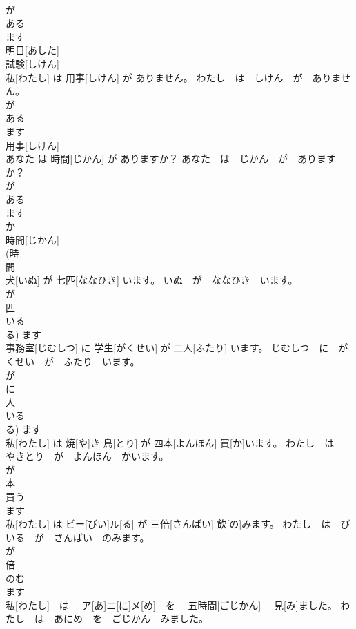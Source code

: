 \documentclass[8pt]{extreport}
\begin{document}
\begin{CJK}{UTF8}{min}
\\	が 
\\	ある 
\\	ます 
\\	明日[あした] 
\\	試験[しけん] 
\\	私[わたし] は 用事[しけん] が ありません。	わたし　は　しけん　が　ありません。	
\\	が 
\\	ある 
\\	ます 
\\	用事[しけん] 
\\	あなた は 時間[じかん] が ありますか？	あなた　は　じかん　が　ありますか？	
\\	が 
\\	ある 
\\	ます 
\\	か 
\\	時間[じかん] 
\\	(時 
\\	間 
\\	犬[いぬ] が 七匹[ななひき] います。	いぬ　が　ななひき　います。	
\\	が 
\\	匹 
\\	いる 
\\	る)	ます 
\\	事務室[じむしつ] に 学生[がくせい] が 二人[ふたり] います。	じむしつ　に　がくせい　が　ふたり　います。	
\\	が 
\\	に 
\\	人 
\\	いる 
\\	る)	ます 
\\	私[わたし] は 焼[や]き 鳥[とり] が 四本[よんほん] 買[か]います。	わたし　は　やきとり　が　よんほん　かいます。	
\\	が 
\\	本 
\\	買う 
\\	ます 
\\	私[わたし] は ビー[びい]ル[る] が 三倍[さんばい] 飲[の]みます。	わたし　は　びいる　が　さんばい　のみます。	
\\	が 
\\	倍 
\\	のむ 
\\	ます 
\\	私[わたし]　は　 ア[あ]ニ[に]メ[め]　を　 五時間[ごじかん]　 見[み]ました。	わたし　は　あにめ　を　ごじかん　みました。	

\end{CJK}
\end{document}
